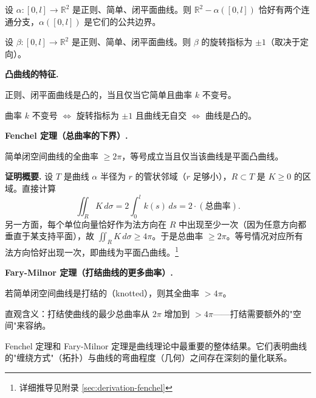 \begin{Theorem}\label{differentiable-jordan}
设 $\alpha: [0,l] \to \mathbb{R}^2$ 是正则、简单、闭平面曲线。则 $\mathbb{R}^2 - \alpha([0,l])$ 恰好有两个连通分支，$\alpha([0,l])$ 是它们的公共边界。
\end{Theorem}

\begin{Theorem}[旋转定理]\label{rotation-index}
设 $\beta: [0,l] \to \mathbb{R}^2$ 是正则、简单、闭平面曲线。则 $\beta$ 的旋转指标为 $\pm 1$（取决于定向）。
\end{Theorem}

\textbf{凸曲线的特征.}

\begin{Proposition}\label{prop:convex-curve}
正则、闭平面曲线是凸的，当且仅当它简单且曲率 $k$ 不变号。
\end{Proposition}

\begin{Remark}
曲率 $k$ 不变号 $\Leftrightarrow$ 旋转指标为 $\pm 1$ 且曲线无自交 $\Leftrightarrow$ 曲线是凸的。
\end{Remark}

\textbf{Fenchel 定理（总曲率的下界）.}

\begin{Theorem}[Fenchel 定理]\label{fenchel}
简单闭空间曲线的全曲率 $\geq 2\pi$，等号成立当且仅当该曲线是平面凸曲线。
\end{Theorem}

\textbf{证明概要.} 设 $T$ 是曲线 $\alpha$ 半径为 $r$ 的管状邻域（$r$ 足够小），$R \subset T$ 是 $K \geq 0$ 的区域。直接计算
\[
\iint_R K\,d\sigma = 2\int_0^l k(s)\,ds = 2\cdot(\text{总曲率}).
\]
另一方面，每个单位向量恰好作为法方向在 $R$ 中出现至少一次（因为任意方向都垂直于某支持平面），故 $\iint_R K\,d\sigma \geq 4\pi$。于是总曲率 $\geq 2\pi$。等号情况对应所有法方向恰好出现一次，即曲线为平面凸曲线。\footnote{详细推导见附录 \cref{sec:derivation-fenchel}}

\textbf{Fary-Milnor 定理（打结曲线的更多曲率）.}

\begin{Theorem}\label{fary-milnor}
若简单闭空间曲线是打结的（knotted），则其全曲率 $> 4\pi$。
\end{Theorem}

直观含义：打结使曲线的最少总曲率从 $2\pi$ 增加到 $>4\pi$——打结需要额外的"空间"来容纳。

\begin{Remark}
Fenchel 定理和 Fary-Milnor 定理是曲线理论中最重要的整体结果。它们表明曲线的"缠绕方式"（拓扑）与曲线的弯曲程度（几何）之间存在深刻的量化联系。
\end{Remark}


